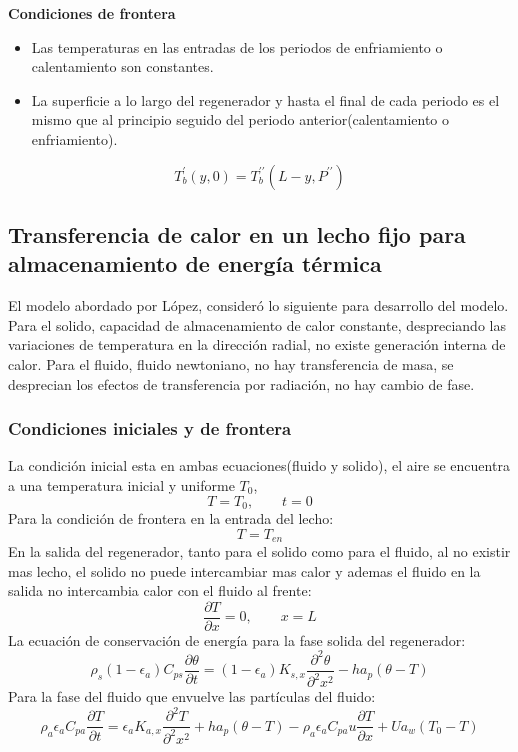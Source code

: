 \documentclass[12pt,letterpaper,final]{article}%
\begin{document}
\textbf{Condiciones de frontera}
\begin{itemize}
	\item Las temperaturas en las entradas de los periodos de enfriamiento o calentamiento son constantes.
	\item La superficie a lo largo del regenerador y hasta el final de cada periodo es el mismo que al principio seguido del periodo anterior(calentamiento o enfriamiento). 
\end{itemize}
\begin{equation*}
	T_b^\prime (y,0) = T_b^{\prime \prime} (L - y,P^{\prime \prime})
\end{equation*}

\subsection*{Transferencia de calor en un lecho fijo para almacenamiento de energía térmica}
El modelo abordado por López\cite{Lopez2013}, consideró lo siguiente para desarrollo del modelo. Para el solido, capacidad de almacenamiento de calor constante, despreciando las variaciones de temperatura en la dirección radial, no existe generación interna de calor. Para el fluido, fluido newtoniano, no hay transferencia de masa, se desprecian los efectos de transferencia por radiación, no hay cambio de fase. 
\subsubsection*{Condiciones iniciales y de frontera}
La condición inicial esta en ambas ecuaciones(fluido y solido), el aire se encuentra a una temperatura inicial y uniforme $T_0$, 
\begin{equation}
	T=T_0 , \qquad t=0
\end{equation} 
Para la condición de frontera en la entrada del lecho:
\begin{equation}
	T=T_{en}
\end{equation}
En la salida del regenerador, tanto para el solido como para el fluido, al no existir mas lecho, el solido no puede intercambiar mas calor y ademas el fluido en la salida no intercambia calor con el fluido al frente:
\begin{equation}
	\frac{\partial T}{\partial x} = 0, \qquad x=L
\end{equation}
La ecuación de conservación de energía para la fase solida del regenerador:
\begin{equation}
	\rho_s(1-\epsilon_a)C_{ps}\frac{\partial \theta}{\partial t} = (1-\epsilon_a)K_{s,x}\frac{\partial^2 \theta}{\partial^2 x^2} - ha_p(\theta - T)
\end{equation}
Para la fase del fluido que envuelve las partículas del fluido:
\begin{equation}
	\rho_a\epsilon_a C_{pa} \frac{\partial T}{\partial t} = \epsilon_a K_{a,x} \frac{\partial^2 T}{\partial^2 x^2} + ha_p(\theta - T) - \rho_a\epsilon_a C_{pa} u \frac{\partial T}{\partial x} + U a_w(T_0 - T )
\end{equation}
\end{document}
